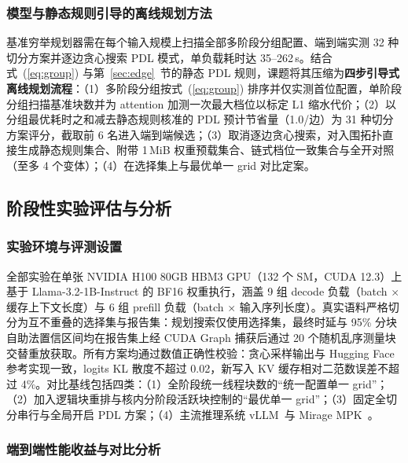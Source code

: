 \subsubsection{模型与静态规则引导的离线规划方法}\label{sec:search}\label{sec:guided}

基准穷举规划器需在每个输入规模上扫描全部多阶段分组配置、端到端实测 32 种切分方案并逐边贪心搜索 PDL 模式，单负载耗时达 35--262\,s。结合式~(\ref{eq:group}) 与第~\ref{sec:edge}~节的静态 PDL 规则，课题将其压缩为\textbf{四步引导式离线规划流程}：（1）多阶段分组按式~(\ref{eq:group}) 排序并仅实测首位配置，单阶段分组扫描基准块数并为 attention 加测一次最大档位以标定 L1 缩水代价；（2）以分组最优耗时之和减去静态规则核准的 PDL 预计节省量（1.0\us/边）为 31 种切分方案评分，截取前 6 名进入端到端候选；（3）取消逐边贪心搜索，对入围拓扑直接生成静态规则集合、附带 1\,MiB 权重预载集合、链式档位一致集合与全开对照（至多 4 个变体）；（4）在选择集上与最优单一 grid 对比定案。

\subsection{阶段性实验评估与分析}\label{sec:exp}

\subsubsection{实验环境与评测设置}

全部实验在单张 NVIDIA H100 80GB HBM3 GPU（132 个 SM，CUDA 12.3）上基于 Llama-3.2-1B-Instruct 的 BF16 权重执行，涵盖 9 组 decode 负载（batch $\times$ 缓存上下文长度）与 6 组 prefill 负载（batch $\times$ 输入序列长度）。真实语料严格切分为互不重叠的选择集与报告集：规划搜索仅使用选择集，最终时延与 95\% 分块自助法置信区间均在报告集上经 CUDA Graph 捕获后通过 20 个随机乱序测量块交替重放获取。所有方案均通过数值正确性校验：贪心采样输出与 Hugging Face 参考实现一致，logits KL 散度不超过 0.02，新写入 KV 缓存相对二范数误差不超过 4\%。对比基线包括四类：（1）全阶段统一线程块数的“统一配置单一 grid”；（2）加入逻辑块重排与核内分阶段活跃块控制的“最优单一 grid”；（3）固定全切分串行与全局开启 PDL 方案；（4）主流推理系统 vLLM~\pVllm 与 Mirage MPK~\pMPK。

\subsubsection{端到端性能收益与对比分析}

